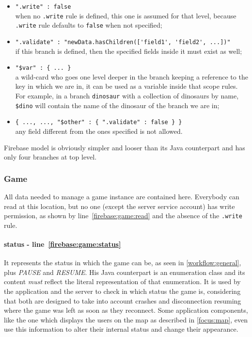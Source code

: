 			\begin{itemize}
				\item \lstinline|".write" : false| \\ when no \lstinline|.write| rule is defined, this one is assumed for that level, because \lstinline|.write| rule defaults to \lstinline|false| when not specified;
				\item \lstinline|".validate" : "newData.hasChildren(['field1', 'field2', ...])"| \\ if this branch is defined, then the specified fields inside it must exist as well;
				\item \lstinline|"$var" : { ... }| \\ a wild-card who goes one level deeper in the branch keeping a reference to the key in which we are in, it can be used as a variable inside that scope rules. For example, in a branch \lstinline|dinosaur| with a collection of dinosaurs by name, \lstinline|$dino| will contain the name of the dinosaur of the branch we are in;
				\item \lstinline|{ ..., ..., "$other" : { ".validate" : false } }| \\ any field different from the ones specified is not allowed.
			\end{itemize}
			
			Firebase model is obviously simpler and looser than its Java counterpart and has only four branches at top level.
			
			
			\subsubsection{Game}
			
				
				
				All data needed to manage a game instance are contained here.
				Everybody can read at this location, but no one (except the server service account) has write permission, as shown by line~\ref{firebase:game:read} and the absence of the \lstinline|.write| rule. \\
				
				\paragraph{status - line~\ref{firebase:game:status}}
				It represents the status in which the game can be, as seen in \autoref{workflow:general}, plus \emph{PAUSE} and \emph{RESUME}.
				His Java counterpart is an enumeration class and its content \emph{must} reflect the literal representation of that enumeration.
				It is used by the application and the server to check in which status the game is, considering that both are designed to take into account crashes and disconnection resuming where the game was left as soon as they reconnect.
				Some application components, like the one which displays the users on the map as described in \autoref{focus:map}, even use this information to alter their internal status and change their appearance.
				
